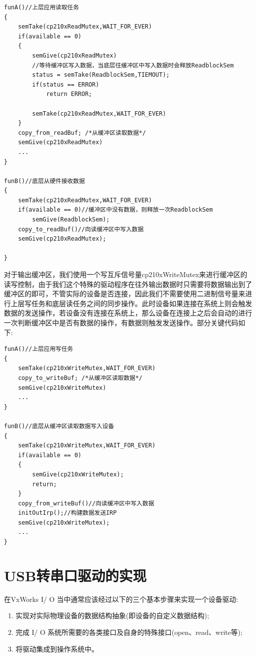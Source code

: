 \lstset{language=C}
\begin{lstlisting}
funA()//上层应用读取任务
{	
	semTake(cp210xReadMutex,WAIT_FOR_EVER)	
	if(available == 0)
	{
		semGive(cp210xReadMutex)
		//等待缓冲区写入数据，当底层往缓冲区中写入数据时会释放ReadblockSem
		status = semTake(ReadblockSem,TIEMOUT);
		if(status == ERROR)
			return ERROR;
			
		semTake(cp210xReadMutex,WAIT_FOR_EVER)
	}
	copy_from_readBuf; /*从缓冲区读取数据*/
	semGive(cp210xReadMutex)
	...
}

funB()//底层从硬件接收数据
{
	semTake(cp210xReadMutex,WAIT_FOR_EVER)
	if(available == 0)//缓冲区中没有数据，则释放一次ReadblockSem
		semGive(ReadblockSem);
	copy_to_readBuf()//向读缓冲区中写入数据
	semGive(cp210xReadMutex);
	
}
\end{lstlisting}  


	对于输出缓冲区，我们使用一个写互斥信号量cp210xWriteMutex来进行缓冲区的读写控制，由于我们这个特殊的驱动程序在往外输出数据时只需要将数据输出到了缓冲区的即可，不管实际的设备是否连接，因此我们不需要使用二进制信号量来进行上层写任务和底层读任务之间的同步操作。此时设备如果连接在系统上则会触发数据的发送操作，若设备没有连接在系统上，那么设备在连接上之后会自动的进行一次判断缓冲区中是否有数据的操作，有数据则触发发送操作。部分关键代码如下:

\lstset{language=C}
\begin{lstlisting}
funA()//上层应用写任务
{	
	semTake(cp210xWriteMutex,WAIT_FOR_EVER)	
	copy_to_writeBuf; /*从缓冲区读取数据*/
	semGive(cp210xWriteMutex)
	...
}

funB()//底层从缓冲区读取数据写入设备
{
	semTake(cp210xWriteMutex,WAIT_FOR_EVER)
	if(available == 0)
	{
		semGive(cp210xWriteMutex);
		return;
	}	
	copy_from_writeBuf()//向读缓冲区中写入数据
	initOutIrp();//构建数据发送IRP
	semGive(cp210xWriteMutex);
	...
}
\end{lstlisting}  

	


\section{USB转串口驱动的实现}	
	
	在VxWorks I/ O 当中通常应该经过以下的三个基本步骤来实现一个设备驱动:
\begin{enumerate}
\item 实现对实际物理设备的数据结构抽象(即设备的自定义数据结构);
\item 完成 I/ O 系统所需要的各类接口及自身的特殊接口(open、read、write等);
\item 将驱动集成到操作系统中。
\end{enumerate}

